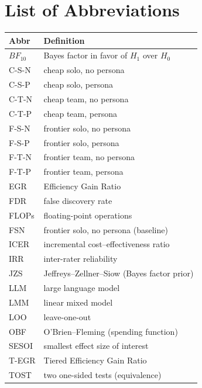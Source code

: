 \documentclass[12pt,a4paper]{article}
\newcommand{\BF}{\ensuremath{\mathit{BF}}}
\begin{document}
\section*{List of Abbreviations}
\small
\begin{longtable}{@{}ll@{}}
\toprule
\textbf{Abbr} & \textbf{Definition} \\
\midrule
$\BF_{10}$        & Bayes factor in favor of $H_1$ over $H_0$ \\
C-S-N             & cheap solo, no persona \\
C-S-P             & cheap solo, persona \\
C-T-N             & cheap team, no persona \\
C-T-P             & cheap team, persona \\
F-S-N             & frontier solo, no persona \\
F-S-P             & frontier solo, persona \\
F-T-N             & frontier team, no persona \\
F-T-P             & frontier team, persona \\
EGR               & Efficiency Gain Ratio \\
FDR               & false discovery rate \\
FLOPs             & floating-point operations \\
FSN               & frontier solo, no persona (baseline) \\
ICER              & incremental cost--effectiveness ratio \\
IRR               & inter-rater reliability \\
JZS               & Jeffreys--Zellner--Siow (Bayes factor prior) \\
LLM               & large language model \\
LMM               & linear mixed model \\
LOO               & leave-one-out \\
OBF               & O'Brien--Fleming (spending function) \\
SESOI             & smallest effect size of interest \\
T-EGR             & Tiered Efficiency Gain Ratio \\
TOST              & two one-sided tests (equivalence) \\
\bottomrule
\end{longtable}
\normalsize

\end{document}
